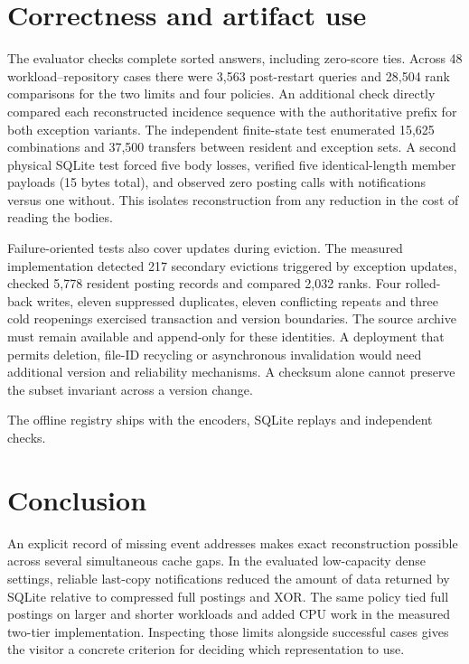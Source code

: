 \documentclass[conference]{IEEEtran}
\begin{document}
\section{Correctness and artifact use}
The evaluator checks complete sorted answers, including zero-score ties. Across 48 workload--repository cases there were 3,563 post-restart queries and 28,504 rank comparisons for the two limits and four policies. An additional check directly compared each reconstructed incidence sequence with the authoritative prefix for both exception variants. The independent finite-state test enumerated 15,625 combinations and 37,500 transfers between resident and exception sets. A second physical SQLite test forced five body losses, verified five identical-length member payloads (15 bytes total), and observed zero posting calls with notifications versus one without. This isolates reconstruction from any reduction in the cost of reading the bodies.

Failure-oriented tests also cover updates during eviction. The measured implementation detected 217 secondary evictions triggered by exception updates, checked 5,778 resident posting records and compared 2,032 ranks. Four rolled-back writes, eleven suppressed duplicates, eleven conflicting repeats and three cold reopenings exercised transaction and version boundaries. The source archive must remain available and append-only for these identities. A deployment that permits deletion, file-ID recycling or asynchronous invalidation would need additional version and reliability mechanisms. A checksum alone cannot preserve the subset invariant across a version change.

The offline registry ships with the encoders, SQLite replays and independent checks.

\balance
\section{Conclusion}
An explicit record of missing event addresses makes exact reconstruction possible across several simultaneous cache gaps. In the evaluated low-capacity dense settings, reliable last-copy notifications reduced the amount of data returned by SQLite relative to compressed full postings and XOR. The same policy tied full postings on larger and shorter workloads and added CPU work in the measured two-tier implementation. Inspecting those limits alongside successful cases gives the visitor a concrete criterion for deciding which representation to use.
\end{document}
